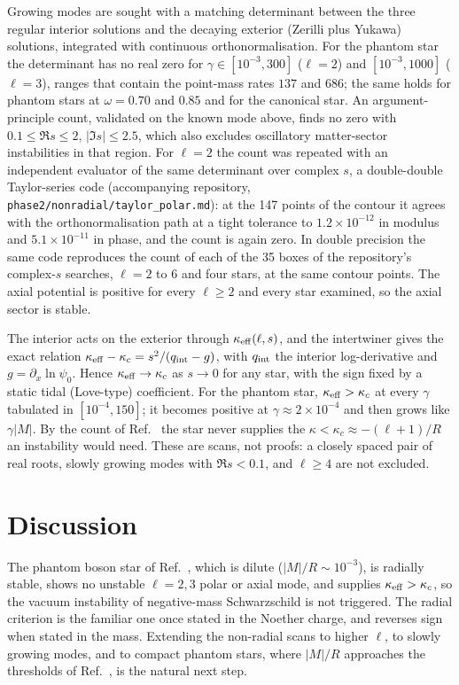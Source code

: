 \documentclass[11pt]{article}
\theoremstyle{remark}
\begin{document}
Growing modes are sought with a matching determinant between the three regular interior solutions and the decaying
exterior (Zerilli plus Yukawa) solutions, integrated with continuous orthonormalisation. For the phantom star the
determinant has no real zero for $\gamma\in[10^{-3},300]$ ($\ell=2$) and $[10^{-3},1000]$ ($\ell=3$), ranges that contain
the point-mass rates $137$ and $686$; the same holds for phantom stars at $\omega=0.70$ and $0.85$ and for the canonical
star. An argument-principle count, validated on the known mode above, finds no zero with $0.1\le\Re s\le2$,
$|\Im s|\le2.5$, which also excludes oscillatory matter-sector instabilities in that region. For $\ell=2$ the count was
repeated with an independent evaluator of the same determinant over complex $s$, a double-double Taylor-series code
(accompanying repository, \texttt{phase2/nonradial/taylor\_polar.md}): at the 147 points of the contour it agrees with the
orthonormalisation path at a tight tolerance to $1.2\times10^{-12}$ in modulus and $5.1\times10^{-11}$ in phase, and the count is
again zero. In double precision the same code reproduces the count of each of the 35 boxes of the repository's complex-$s$
searches, $\ell=2$ to $6$ and four stars, at the same contour points. The axial potential is
positive for every $\ell\ge2$ and every star examined, so the axial sector is stable.

The interior acts on the exterior through $\kappa_{\rm eff}(\ell,s)$, and the intertwiner gives the exact relation
$\kappa_{\rm eff}-\kappa_c=s^2/(q_{\rm int}-g)$, with $q_{\rm int}$ the interior log-derivative and $g=\partial_x\ln\psi_0$.
Hence $\kappa_{\rm eff}\to\kappa_c$ as $s\to0$ for any star, with the sign fixed by a static tidal (Love-type)
coefficient. For the phantom star, $\kappa_{\rm eff}>\kappa_c$ at every $\gamma$ tabulated in $[10^{-4},150]$; it becomes
positive at $\gamma\approx2\times10^{-4}$ and then grows like $\gamma|M|$. By the count of Ref.~\cite{Moinvaziri2026a} the star never
supplies the $\kappa<\kappa_c\approx-(\ell+1)/R$ an instability would need. These are scans, not proofs: a closely spaced
pair of real roots, slowly growing modes with $\Re s<0.1$, and $\ell\ge4$ are not excluded.

\section{Discussion}\label{sec:discussion}

The phantom boson star of Ref.~\cite{Shirokov2026}, which is dilute ($|M|/R\sim10^{-3}$), is radially stable, shows
no unstable $\ell=2,3$ polar or axial mode, and supplies $\kappa_{\rm eff}>\kappa_c$, so the vacuum instability of
negative-mass Schwarzschild is not triggered. The radial criterion is the familiar one once stated in the Noether charge,
and reverses sign when stated in the mass. Extending the non-radial scans to higher $\ell$, to slowly growing modes, and
to compact phantom stars, where $|M|/R$ approaches the thresholds of Ref.~\cite{Moinvaziri2026a}, is the natural next
step.
\end{document}
